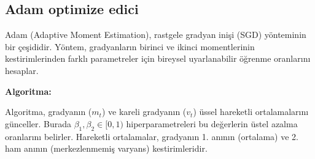 \subsection{Adam optimize edici}

Adam (Adaptive Moment Estimation), rastgele gradyan inişi (SGD) yönteminin bir çeşididir. Yöntem, gradyanların birinci ve ikinci momentlerinin kestirimlerinden farklı parametreler için bireysel uyarlanabilir öğrenme oranlarını hesaplar.

\textbf{Algoritma:}

Algoritma, gradyanın (\(m_t\)) ve kareli gradyanın (\(v_t\)) üssel hareketli ortalamalarını günceller. Burada \(\beta_1, \beta_2 \in [0, 1)\) hiperparametreleri bu değerlerin üstel azalma oranlarını belirler. Hareketli ortalamalar, gradyanın 1. anının (ortalama) ve 2. ham anının (merkezlenmemiş varyans) kestirimleridir.


